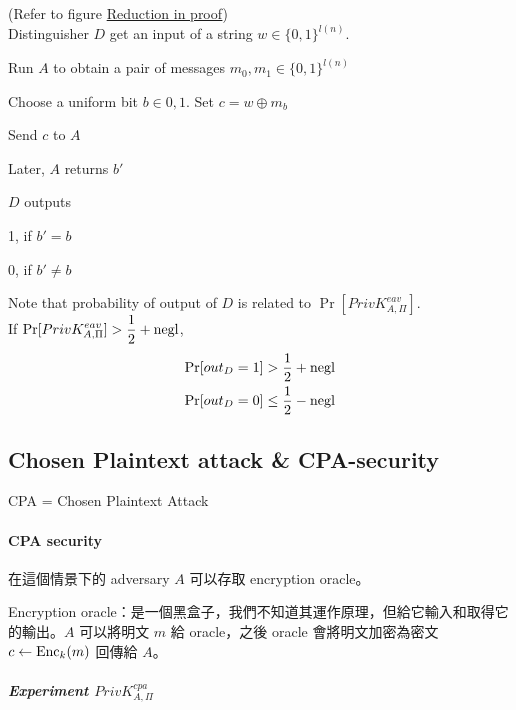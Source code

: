 \begin{myProof}
	(Refer to figure \hyperref[fig:reduction]{Reduction in proof}) \\
	Distinguisher \(D\) get an input of a string \(w \in \{0, 1\}^{l(n)}\).
	\begin{steps}
		\item Run \(A\) to obtain a pair of messages \(m_0, m_1 \in \{0, 1\}^{l(n)}\)
		\item Choose a uniform bit \(b \in {0, 1}\). Set \(c = w \oplus m_b\)
		\item Send \(c\) to \(A\)
		\item Later, \(A\) returns \(b'\)
	\end{steps}
	
	\(D\) outputs
	\begin{myItemize}[label=—]
		\item 1, if \(b' = b\)
		\item 0, if \(b' \neq b\)
	\end{myItemize}
	
	Note that probability of output of \(D\) is related to \(\Pr[PrivK_{A, \Pi}^{eav}]\). \\
	If \(\displaystyle \Pr[PrivK_{A, \Pi}^{eav}] > \frac{1}{2} + \operatorname{negl}\),
	\begin{align*}
		\Pr[out_D = 1] > \frac{1}{2} + \operatorname{negl} \\
		\Pr[out_D = 0] \leq \frac{1}{2} - \operatorname{negl}
	\end{align*}
\end{myProof}


\subsection{Chosen Plaintext attack \& CPA-security}

CPA = Chosen Plaintext Attack


\paragraph{CPA security}

在這個情景下的 adversary \(A\) 可以存取 encryption oracle。

Encryption oracle：是一個黑盒子，我們不知道其運作原理，但給它輸入和取得它的輸出。\(A\) 可以將明文 \(m\) 給 oracle，之後 oracle 會將明文加密為密文 \(c \leftarrow \operatorname{Enc}_k(m)\) 回傳給 \(A\)。

\subparagraph{Experiment \quad \(PrivK_{A, \Pi}^{cpa}\)}

